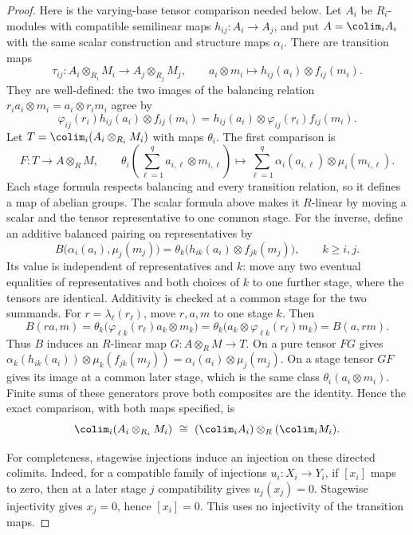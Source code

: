 \begin{proof}
Here is the varying-base tensor comparison needed below.
Let $A_i$ be $R_i$-modules with compatible semilinear maps
$h_{ij}:A_i\to A_j$, and put $A=\colim_i A_i$ with the
same scalar construction and structure maps $\alpha_i$.
There are transition maps
$$
\tau_{ij}:A_i\otimes_{R_i}M_i\longrightarrow A_j\otimes_{R_j}M_j,
\qquad a_i\otimes m_i\longmapsto h_{ij}(a_i)\otimes f_{ij}(m_i).
$$
They are well-defined: the two images of the balancing
relation $r_ia_i\otimes m_i=a_i\otimes r_im_i$ agree by
$$
\varphi_{ij}(r_i)h_{ij}(a_i)\otimes f_{ij}(m_i)
=h_{ij}(a_i)\otimes\varphi_{ij}(r_i)f_{ij}(m_i).
$$
Let $T=\colim_i(A_i\otimes_{R_i}M_i)$ with maps $\theta_i$.
The first comparison is
$$
F:T\longrightarrow A\otimes_R M,\qquad
\theta_i\left(\sum_{\ell=1}^q a_{i,\ell}\otimes m_{i,\ell}\right)
\longmapsto\sum_{\ell=1}^q
\alpha_i(a_{i,\ell})\otimes\mu_i(m_{i,\ell}).
$$
Each stage formula respects balancing and every transition
relation, so it defines a map of abelian groups. The scalar
formula above makes it $R$-linear by moving a scalar and
the tensor representative to one common stage.
For the inverse, define an additive balanced pairing on
representatives by
$$
B\bigl(\alpha_i(a_i),\mu_j(m_j)\bigr)
=\theta_k\bigl(h_{ik}(a_i)\otimes f_{jk}(m_j)\bigr),
\qquad k\geq i,j.
$$
Its value is independent of representatives and $k$:
move any two eventual equalities of representatives and
both choices of $k$ to one further stage, where the tensors
are identical. Additivity is checked at a common stage for
the two summands. For $r=\lambda_\ell(r_\ell)$, move
$r,a,m$ to one stage $k$. Then
$$
B(ra,m)=\theta_k\bigl(\varphi_{\ell k}(r_\ell)a_k\otimes m_k\bigr)
=\theta_k\bigl(a_k\otimes\varphi_{\ell k}(r_\ell)m_k\bigr)
=B(a,rm).
$$
Thus $B$ induces an $R$-linear map $G:A\otimes_R M\to T$.
On a pure tensor $FG$ gives
$\alpha_k(h_{ik}(a_i))\otimes\mu_k(f_{jk}(m_j))
=\alpha_i(a_i)\otimes\mu_j(m_j)$.
On a stage tensor $GF$ gives its image at a common later
stage, which is the same class $\theta_i(a_i\otimes m_i)$.
Finite sums of these generators prove both composites are
the identity. Hence the exact comparison, with both maps
specified, is
$$
\colim_i(A_i\otimes_{R_i}M_i)
\ \cong\ (\colim_i A_i)\otimes_R(\colim_i M_i).
$$

For completeness, stagewise injections induce an injection
on these directed colimits. Indeed, for a compatible family
of injections $u_i:X_i\to Y_i$, if $[x_i]$ maps to zero,
then at a later stage $j$ compatibility gives $u_j(x_j)=0$.
Stagewise injectivity gives $x_j=0$, hence $[x_i]=0$.
This uses no injectivity of the transition maps.


\end{proof}
